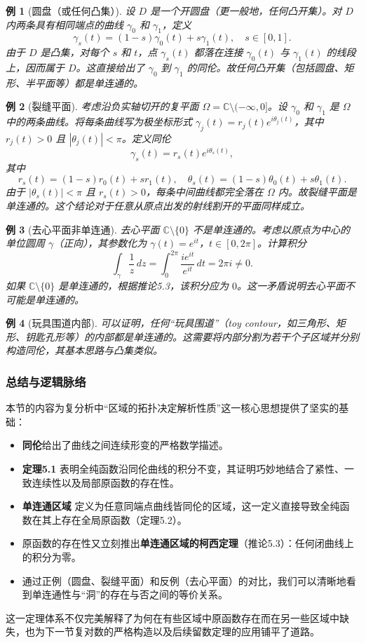 \documentclass[UTF8]{ctexart}
\newtheorem{example}{例}[section]
\numberwithin{equation}{section}
\newcommand{\CC}{\mathbb{C}}
\begin{document}
\begin{example}[圆盘（或任何凸集）]
设 $D$ 是一个开圆盘（更一般地，任何凸开集）。对 $D$ 内两条具有相同端点的曲线 $\gamma_0$ 和 $\gamma_1$，定义
\[
\gamma_s(t) = (1-s)\gamma_0(t) + s\gamma_1(t),\quad s\in[0,1].
\]
由于 $D$ 是凸集，对每个 $s$ 和 $t$，点 $\gamma_s(t)$ 都落在连接 $\gamma_0(t)$ 与 $\gamma_1(t)$ 的线段上，因而属于 $D$。这直接给出了 $\gamma_0$ 到 $\gamma_1$ 的同伦。故任何凸开集（包括圆盘、矩形、半平面等）都是单连通的。
\end{example}

\begin{example}[裂缝平面]
考虑沿负实轴切开的复平面 $\Omega=\CC\setminus(-\infty,0]$。设 $\gamma_0$ 和 $\gamma_1$ 是 $\Omega$ 中的两条曲线。将每条曲线写为极坐标形式 $\gamma_j(t)=r_j(t)e^{i\theta_j(t)}$，其中 $r_j(t)>0$ 且 $|\theta_j(t)|<\pi$。定义同伦
\[
\gamma_s(t) = r_s(t)e^{i\theta_s(t)},
\]
其中
\[
r_s(t) = (1-s)r_0(t) + s r_1(t),\quad \theta_s(t) = (1-s)\theta_0(t) + s\theta_1(t).
\]
由于 $|\theta_s(t)|<\pi$ 且 $r_s(t)>0$，每条中间曲线都完全落在 $\Omega$ 内。故裂缝平面是单连通的。这个结论对于任意从原点出发的射线割开的平面同样成立。
\end{example}

\begin{example}[去心平面非单连通]
去心平面 $\CC\setminus\{0\}$ 不是单连通的。考虑以原点为中心的单位圆周 $\gamma$（正向），其参数化为 $\gamma(t)=e^{it}$，$t\in[0,2\pi]$。计算积分
\[
\int_{\gamma} \frac{1}{z}\,dz = \int_0^{2\pi} \frac{ie^{it}}{e^{it}}\,dt = 2\pi i \neq 0 .
\]
如果 $\CC\setminus\{0\}$ 是单连通的，根据推论5.3，该积分应为 $0$。这一矛盾说明去心平面不可能是单连通的。
\end{example}

\begin{example}[玩具围道内部]
可以证明，任何“玩具围道”（toy contour，如三角形、矩形、钥匙孔形等）的内部都是单连通的。这需要将内部分割为若干个子区域并分别构造同伦，其基本思路与凸集类似。
\end{example}

\subsubsection{总结与逻辑脉络}

本节的内容为复分析中“区域的拓扑决定解析性质”这一核心思想提供了坚实的基础：

\begin{itemize}
    \item \textbf{同伦}给出了曲线之间连续形变的严格数学描述。
    \item \textbf{定理5.1} 表明全纯函数沿同伦曲线的积分不变，其证明巧妙地结合了紧性、一致连续性以及局部原函数的存在性。
    \item \textbf{单连通区域} 定义为任意同端点曲线皆同伦的区域，这一定义直接导致全纯函数在其上存在全局原函数（定理5.2）。
    \item 原函数的存在性又立刻推出\textbf{单连通区域的柯西定理}（推论5.3）：任何闭曲线上的积分为零。
    \item 通过正例（圆盘、裂缝平面）和反例（去心平面）的对比，我们可以清晰地看到单连通性与“洞”的存在与否之间的等价关系。
\end{itemize}

这一定理体系不仅完美解释了为何在有些区域中原函数存在而在另一些区域中缺失，也为下一节复对数的严格构造以及后续留数定理的应用铺平了道路。
\end{document}
